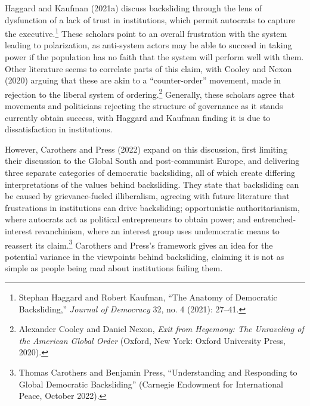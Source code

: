 \documentclass[
  letterpaper,
  DIV=11,
  numbers=noendperiod]{scrartcl}
\begin{document}
Haggard and Kaufman (2021a) discuss backsliding through the lens of
dysfunction of a lack of trust in institutions, which permit autocrats
to capture the executive.\footnote{Stephan Haggard and Robert Kaufman,
  {``The {Anatomy} of {Democratic Backsliding},''} \emph{Journal of
  Democracy} 32, no. 4 (2021): 27--41.} These scholars point to an
overall frustration with the system leading to polarization, as
anti-system actors may be able to succeed in taking power if the
population has no faith that the system will perform well with them.
Other literature seems to correlate parts of this claim, with Cooley and
Nexon (2020) arguing that these are akin to a ``counter-order''
movement, made in rejection to the liberal system of
ordering.\footnote{Alexander Cooley and Daniel Nexon, \emph{Exit from
  {Hegemony}: {The Unraveling} of the {American Global Order}} (Oxford,
  New York: Oxford University Press, 2020).} Generally, these scholars
agree that movements and politicians rejecting the structure of
governance as it stands currently obtain success, with Haggard and
Kaufman finding it is due to dissatisfaction in institutions.

However, Carothers and Press (2022) expand on this discussion, first
limiting their discussion to the Global South and post-communist Europe,
and delivering three separate categories of democratic backsliding, all
of which create differing interpretations of the values behind
backsliding. They state that backsliding can be caused by
grievance-fueled illiberalism, agreeing with future literature that
frustrations in institutions can drive backsliding; opportunistic
authoritarianism, where autocrats act as political entrepreneurs to
obtain power; and entrenched-interest revanchinism, where an interest
group uses undemocratic means to reassert its claim.\footnote{Thomas
  Carothers and Benjamin Press, {``Understanding and {Responding} to
  {Global Democratic Backsliding}''} (Carnegie Endowment for
  International Peace, October 2022).} Carothers and Press's framework
gives an idea for the potential variance in the viewpoints behind
backsliding, claiming it is not as simple as people being mad about
institutions failing them.
\end{document}
